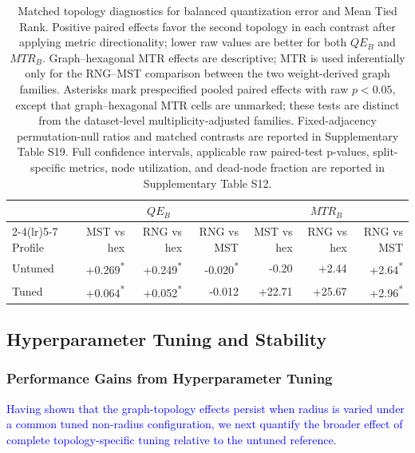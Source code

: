 \documentclass[10pt]{article} %
\newcommand{\TrackedChange}[1]{\textcolor{blue}{#1}}
\begin{document}
\begin{table}[tb]
\color{blue}
\caption{Matched topology diagnostics for balanced quantization error and Mean Tied Rank. Positive paired effects favor the second topology in each contrast after applying metric directionality; lower raw values are better for both $QE_B$ and $MTR_B$. Graph--hexagonal MTR effects are descriptive; MTR is used inferentially only for the RNG--MST comparison between the two weight-derived graph families. Asterisks mark prespecified pooled paired effects with raw $p<0.05$, except that graph--hexagonal MTR cells are unmarked; these tests are distinct from the dataset-level multiplicity-adjusted families. Fixed-adjacency permutation-null ratios and matched contrasts are reported in Supplementary Table S19. Full confidence intervals, applicable raw paired-test p-values, split-specific metrics, node utilization, and dead-node fraction are reported in Supplementary Table S12.}
\label{tab:matched_topology_diagnostics_summary}
\begin{center}
\begin{tabular}{lrrrrrr}
\toprule
& \multicolumn{3}{c}{$QE_B$} & \multicolumn{3}{c}{$MTR_B$} \\
\cmidrule(lr){2-4}\cmidrule(lr){5-7}
Profile & MST vs hex & RNG vs hex & RNG vs MST & MST vs hex & RNG vs hex & RNG vs MST \\
\midrule
Untuned & +0.269\textsuperscript{*} & +0.249\textsuperscript{*} & -0.020\textsuperscript{*} & -0.20 & +2.44 & +2.64\textsuperscript{*} \\
Tuned & +0.064\textsuperscript{*} & +0.052\textsuperscript{*} & -0.012 & +22.71 & +25.67 & +2.96\textsuperscript{*} \\
\bottomrule
\end{tabular}
\end{center}
\end{table}

\subsection{Hyperparameter Tuning and Stability}

\subsubsection{Performance Gains from Hyperparameter Tuning}

\TrackedChange{Having shown that the graph-topology effects persist when radius is varied under a common tuned non-radius configuration, we next quantify the broader effect of complete topology-specific tuning relative to the untuned reference.}
\end{document}
